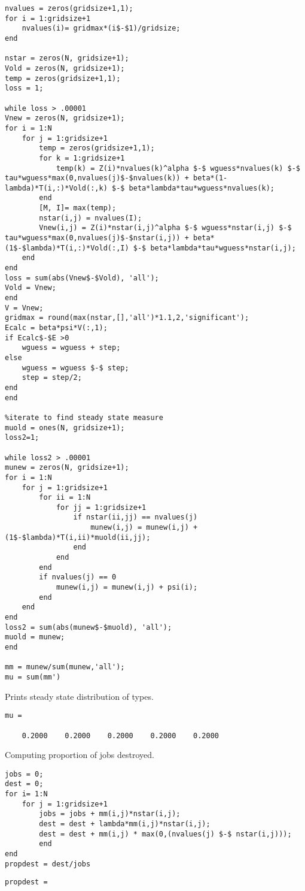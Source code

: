\documentclass[12pt]{article}
\begin{document}
\begin{onehalfspace}
\begin{enumerate}[1.]
\begin{enumerate}
\begin{lstlisting}
nvalues = zeros(gridsize+1,1);
for i = 1:gridsize+1
    nvalues(i)= gridmax*(i$-$1)/gridsize; 
end

nstar = zeros(N, gridsize+1);
Vold = zeros(N, gridsize+1);
temp = zeros(gridsize+1,1);
loss = 1;

while loss > .00001
Vnew = zeros(N, gridsize+1);
for i = 1:N
    for j = 1:gridsize+1
        temp = zeros(gridsize+1,1);
        for k = 1:gridsize+1
            temp(k) = Z(i)*nvalues(k)^alpha $-$ wguess*nvalues(k) $-$ tau*wguess*max(0,nvalues(j)$-$nvalues(k)) + beta*(1-lambda)*T(i,:)*Vold(:,k) $-$ beta*lambda*tau*wguess*nvalues(k);
        end
        [M, I]= max(temp);
        nstar(i,j) = nvalues(I);
        Vnew(i,j) = Z(i)*nstar(i,j)^alpha $-$ wguess*nstar(i,j) $-$ tau*wguess*max(0,nvalues(j)$-$nstar(i,j)) + beta*(1$-$lambda)*T(i,:)*Vold(:,I) $-$ beta*lambda*tau*wguess*nstar(i,j);
    end
end
loss = sum(abs(Vnew$-$Vold), 'all');
Vold = Vnew;
end
V = Vnew;
gridmax = round(max(nstar,[],'all')*1.1,2,'significant');
Ecalc = beta*psi*V(:,1);
if Ecalc$-$E >0
    wguess = wguess + step;
else
    wguess = wguess $-$ step;
    step = step/2;
end
end

%iterate to find steady state measure
muold = ones(N, gridsize+1);
loss2=1;

while loss2 > .00001
munew = zeros(N, gridsize+1);
for i = 1:N
    for j = 1:gridsize+1
        for ii = 1:N
            for jj = 1:gridsize+1
                if nstar(ii,jj) == nvalues(j)
                    munew(i,j) = munew(i,j) + (1$-$lambda)*T(i,ii)*muold(ii,jj);
                end
            end
        end
        if nvalues(j) == 0
            munew(i,j) = munew(i,j) + psi(i);
        end
    end
end
loss2 = sum(abs(munew$-$muold), 'all');
muold = munew;
end

mm = munew/sum(munew,'all');
mu = sum(mm')
\end{lstlisting}
Prints steady state distribution of types.
\begin{lstlisting}
mu =

    0.2000    0.2000    0.2000    0.2000    0.2000
\end{lstlisting}
Computing proportion of jobs destroyed.
\begin{lstlisting}
jobs = 0;
dest = 0;
for i= 1:N
    for j = 1:gridsize+1
        jobs = jobs + mm(i,j)*nstar(i,j);
        dest = dest + lambda*mm(i,j)*nstar(i,j);
        dest = dest + mm(i,j) * max(0,(nvalues(j) $-$ nstar(i,j)));
        end
end
propdest = dest/jobs
\end{lstlisting}
\begin{lstlisting}
propdest =


\end{lstlisting}
\end{enumerate}
\end{enumerate}
\end{onehalfspace}
\end{document}
